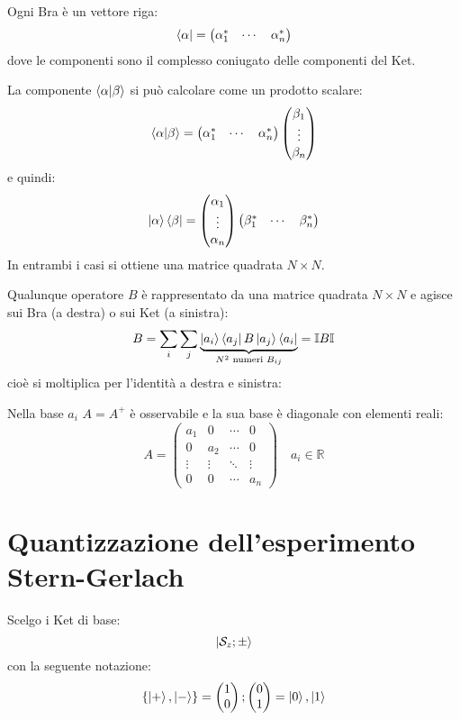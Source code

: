 \documentclass[a4paper]{article}
\begin{document}
\vspace{1em}
\noindent
Ogni Bra è un vettore riga:
\[
  \bra{\alpha} = \begin{pmatrix} \alpha_1^* & \cdots & \alpha_n^* \end{pmatrix}
\] 
dove le componenti sono il complesso coniugato delle componenti del Ket.

\vspace{1em}
\noindent
La componente \( \braket{\alpha}{\beta} \) si può calcolare come un prodotto scalare:
\[
  \braket{\alpha}{\beta} = 
  \begin{pmatrix} \alpha_1^* & \cdots & \alpha_n^* \end{pmatrix}
  \begin{pmatrix} 
    \beta_1\\
    \vdots\\
    \beta_n
  \end{pmatrix}
\] 
e quindi:
\[
  \ket{\alpha} \bra{\beta} =
  \begin{pmatrix} 
    \alpha_1\\
    \vdots\\
    \alpha_n
  \end{pmatrix}
  \begin{pmatrix} \beta_1^* & \cdots & \beta_n^* \end{pmatrix}
\] 
In entrambi i casi si ottiene una matrice quadrata \( N \times N \).

\vspace{1em}
\noindent
Qualunque operatore \( B \) è rappresentato da una matrice quadrata \( N \times N \) e
agisce sui Bra (a destra) o sui Ket (a sinistra):
\[
  B = \sum_i \sum_j \underbrace{\ket{a_i} \bra{a_j} B \ket{a_j} \bra{a_i}}_{
    N^2 \text{ numeri } B_{ij}
  } = \mathbb{I} B \mathbb{I}
\] 
cioè si moltiplica per l'identità a destra e sinistra:

\vspace{1em}
\noindent
Nella base \( a_i \) \( A = A^+ \) è osservabile e la sua base è diagonale con elementi reali:
\[
  A = 
  \begin{pmatrix} 
    a_1 & 0 & \cdots & 0\\
    0 & a_2 & \cdots & 0\\
    \vdots & \vdots & \ddots & \vdots\\
    0 & 0 & \cdots & a_n
  \end{pmatrix}
  \quad a_i \in \mathbb{R}
\]

\section{Quantizzazione dell'esperimento Stern-Gerlach}
Scelgo i Ket di base:
\[
  \ket{\mathcal{S}_z; \pm}
\] 
con la seguente notazione:
\[
  \{\ket{+}, \ket{-}\} =
    \begin{pmatrix} 1\\0 \end{pmatrix};
    \begin{pmatrix} 0\\1 \end{pmatrix}
  =
  \ket{0}, \ket{1}
\] 
\end{document}
